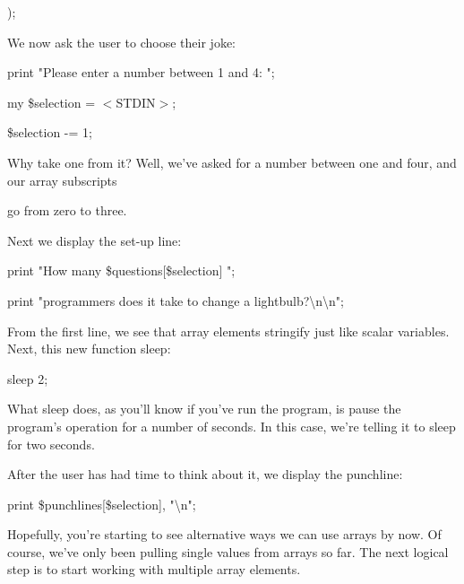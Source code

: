 \documentclass[a4paper,11pt]{book}
\begin{document}
\noindent );

\noindent 

\noindent We now ask the user to choose their joke:

\noindent 

\noindent print "Please enter a number between 1 and 4: ";

\noindent my \$selection = $<$STDIN$>$;

\noindent \$selection -= 1;

\noindent 

\noindent 

\noindent Why take one from it? Well, we've asked for a number between one and four, and our array subscripts

\noindent go from zero to three.

\noindent 

\noindent Next we display the set-up line:

\noindent 

\noindent 

\noindent print "How many \$questions[\$selection] ";

\noindent print "programmers does it take to change a lightbulb?\textbackslash n\textbackslash n";

\noindent 

\noindent From the first line, we see that array elements stringify just like scalar variables. Next, this new function sleep:

\noindent 

\noindent sleep 2;

\noindent 

\noindent What sleep does, as you'll know if you've run the program, is pause the program's operation for a number of seconds. In this case, we're telling it to sleep for two seconds.

\noindent 

\noindent After the user has had time to think about it, we display the punchline:

\noindent 

\noindent 

\noindent print \$punchlines[\$selection], "\textbackslash n";

\noindent 

\noindent Hopefully, you're starting to see alternative ways we can use arrays by now. Of course, we've only been pulling single values from arrays so far. The next logical step is to start working with multiple array elements.
\end{document}
